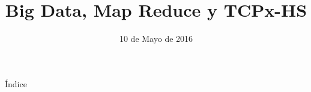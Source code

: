 \documentclass[compress]{beamer}
\title{Big Data, Map Reduce y TCPx-HS}
\date{10 de Mayo de 2016}
\newcommand{\importsection}[1]{}           %
\begin{document}
	{
		\begin{frame}[plain]
			\titlepage
		\end{frame}			
	}

	\importsection{Motivacion.tex}

	\begin{frame}{Índice}
		\hypertarget{index}{}
		\tableofcontents
	\end{frame}
	
	\importsection{BigData.tex}

	\importsection{MapReduce.tex}

	\importsection{TPCx-HS.tex}

	\importsection{Conclusion.tex}
	
\end{document}
